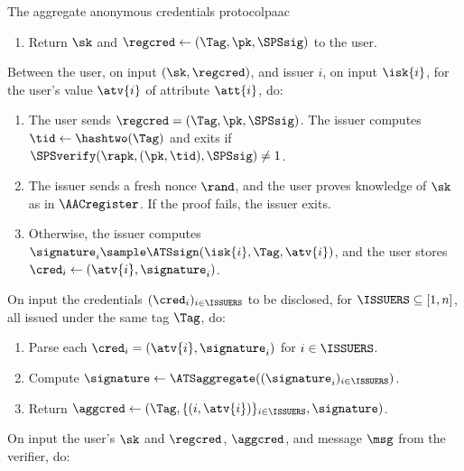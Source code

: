 \begin{protocolbox}{The aggregate anonymous credentials protocol}{paac}
\begin{description}
\begin{enumerate}
	\item Return $\sk$ and $\regcred \leftarrow (\Tag,\pk,\SPSsig)$ to the
user.

      \end{enumerate}

    \item[$\cred \sample \AACissue(\crs,\isk{},\regcred,\att{})$ :] Between
the user, on input $(\sk, \regcred)$, and issuer $i$, on input $\isk{i}$, for
the user's value $\atv{i}$ of attribute $\att{i}$, do:

      \begin{enumerate}

	\item The user sends $\regcred = (\Tag,\pk,\SPSsig)$. The issuer
computes $\tid \leftarrow \hashtwo(\Tag)$ and exits if
$\SPSverify(\rapk,(\pk,\tid),\SPSsig) \neq 1$.

	\item The issuer sends a fresh nonce $\rand$, and the user proves
knowledge of $\sk$ as in $\AACregister$. If the proof fails, the issuer exits.

	\item Otherwise, the issuer computes $\signature_i \sample
\ATSsign(\isk{i},\Tag,\atv{i})$, and the user stores $\cred_i \leftarrow
(\atv{i},\signature_i)$.

      \end{enumerate}

    \item[$\aggcred \leftarrow \AACaggregate(\crs,(\cred_i)_{i \in \ISSUERS})$ :]
On input the credentials $(\cred_i)_{i \in \ISSUERS}$ to be disclosed, for
$\ISSUERS \subseteq [1,n]$, all issued under the same tag $\Tag$, do:

      \begin{enumerate}

	\item Parse each $\cred_i = (\atv{i},\signature_i)$ for $i \in \ISSUERS$.

	\item Compute $\signature \leftarrow
\ATSaggregate((\signature_i)_{i\in\ISSUERS})$.

	\item Return $\aggcred \leftarrow
(\Tag,\{(i, \atv{i})\}_{i\in\ISSUERS},\signature)$.

      \end{enumerate}

    \item[$\algoproof \sample \AACpresent(\crs,\sk,\regcred,\aggcred,\msg)$ :]
On input the user's $\sk$ and $\regcred$, $\aggcred$, and message $\msg$
from the verifier, do:


\end{description}
\end{protocolbox}
